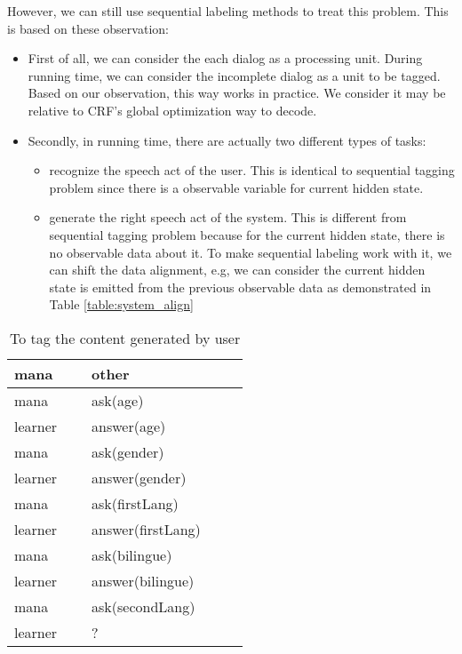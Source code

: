 \documentclass[a4paper]{article}
\begin{document}
However, we can still use sequential labeling methods to treat this problem. This is based on these observation:
\begin{itemize}
    \item First of all, we can consider the each dialog as a processing unit. During running time, we can consider the incomplete dialog as a unit to be tagged. Based on our observation, this way works in practice. We consider it may be relative to CRF's global optimization way to decode. 
    \item Secondly, in running time, there are actually two different types of tasks:
        \begin{itemize}
            \item recognize the speech act of the user. This is identical to sequential tagging problem since there is a observable variable for current hidden state.
            \item generate the right speech act of the system. This is different from sequential tagging problem because for the current hidden state, there is no observable data about it. To make sequential labeling work with it, we can shift the data alignment, e.g, we can consider the current hidden state is emitted from the previous observable data as demonstrated in Table \ref{table:system_align} 
        \end{itemize}
\end{itemize}
\begin{table}
    \begin{tabular}{|l|l|}
        \hline
        mana    & other              \\ \hline
        mana    & ask(age)           \\ \hline
        learner & answer(age)        \\ \hline
        mana    & ask(gender)        \\ \hline
        learner & answer(gender)     \\ \hline
        mana    & ask(firstLang)     \\ \hline
        learner & answer(firstLang)  \\ \hline
        mana    & ask(bilingue)      \\ \hline
        learner & answer(bilingue)   \\ \hline
        mana    & ask(secondLang)    \\ \hline
        learner & ?                  \\ \hline
    \end{tabular}
    \caption{To tag the content generated by user}
    \label{table:user_align}
\end{table}
\end{document}

